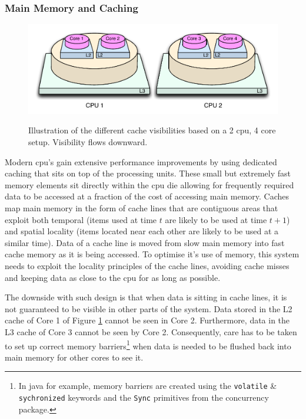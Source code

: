 \documentclass[a4paper,11pt]{scrreprt}
\begin{document}
\subsubsection{Main Memory and Caching}
\begin{figure}[h]
\centering
\caption{Illustration of the different cache visibilities based on a 2 \acrshort{cpu}, 4 core setup. Visibility flows downward.}
\includegraphics[scale=0.65] {cachelevels.pdf}
\label{fig:corecachedesign}
\end{figure}
Modern \acrshort{cpu}'s gain extensive performance improvements by using dedicated caching that sits on top of the processing units. These small but extremely fast memory elements sit directly within the \acrshort{cpu} die allowing for frequently required data to be accessed at a fraction of the cost of accessing main memory. Caches map main memory in the form of cache lines that are contiguous areas that exploit both temporal (items used at time \(t\) are likely to be used at time \(t+1\)) and spatial locality (items located near each other are likely to be used at a similar time). Data of a cache line is moved from slow main memory into fast cache memory as it is being accessed. To optimise it's use of memory, this system needs to exploit the locality principles of the cache lines, avoiding cache misses and keeping data as close to the \acrshort{cpu} for as long as possible. 

The downside with such design is that when data is sitting in cache lines, it is not guaranteed to be visible in other parts of the system. Data stored in the L2 cache of Core 1 of Figure \ref{fig:corecachedesign} cannot be seen in Core 2. Furthermore, data in the L3 cache of Core 3 cannot be seen by Core 2. Consequently, care has to be taken to set up correct memory barriers\footnote{In java for example, memory barriers are created using the \texttt{volatile} \& \texttt{sychronized} keywords and the \texttt{Sync} primitives from the concurrency package.} when data is needed to be flushed back into main memory for other cores to see it.
\end{document}
